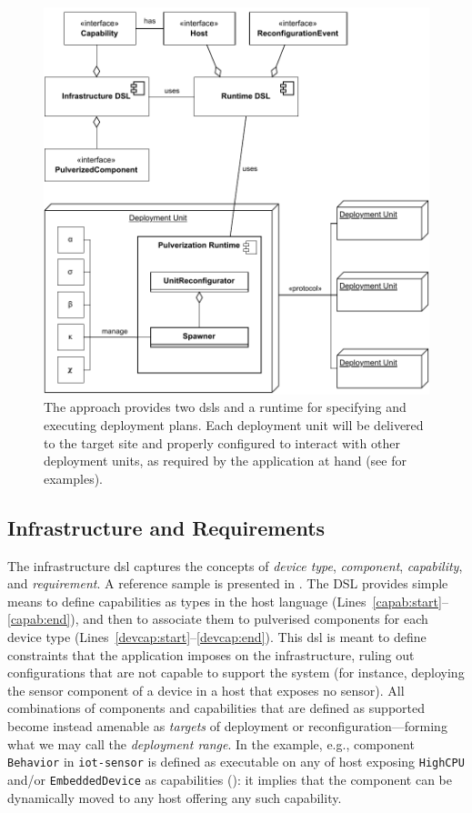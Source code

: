 \documentclass[conference]{IEEEtran}
\begin{document}
\begin{figure}
\includegraphics[width=\columnwidth]{figures/pulverization-framework-overview.drawio.pdf}
\caption{The approach provides two \acp{dsl} and a runtime for specifying and executing deployment plans. Each deployment unit will be delivered to the target site and properly configured to interact with other deployment units, as required by the application at hand (see   for examples).}
\label{fig:approach}
\end{figure}

\subsection{Infrastructure and Requirements}

The infrastructure \ac{dsl} captures the concepts of
\emph{device type}, \emph{component}, \emph{capability}, and \emph{requirement}.
%
A reference sample is presented in .
%
The DSL provides simple means to define capabilities as types in the host language (Lines~\ref{capab:start}--\ref{capab:end}),
and then to associate them to pulverised components for each device type (Lines~\ref{devcap:start}--\ref{devcap:end}).
%
This \ac{dsl} is meant to define constraints that the application imposes on the infrastructure,
ruling out configurations that are not capable to support the system
(for instance, deploying the sensor component of a device in a host that exposes no sensor).
%
All combinations of components and capabilities that are defined as supported become instead amenable as \emph{targets} of deployment or reconfiguration---forming what we may call the \emph{deployment range}.
%
In the example, e.g., component \texttt{Behavior} in \texttt{iot-sensor} is defined as executable on any of host exposing
\texttt{HighCPU} and/or \texttt{EmbeddedDevice} as capabilities ():
it implies that the component can be dynamically moved to any host offering any such capability.
\end{document}
